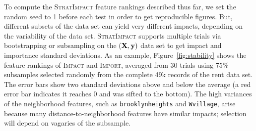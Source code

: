 \documentclass[11pt]{article}
\newcommand{\figref}[1]{Figure~\ref{#1}}
\newcommand{\Imp}{\fontfamily{cmr}\textsc{Impact}}
\newcommand{\Impo}{\fontfamily{cmr}\textsc{Import}}
\newcommand{\simp}{\fontfamily{cmr}\textsc{\small StratImpact}}
\begin{document}
To compute the \simp{} feature rankings described thus far, we set the random seed to 1 before each test in order to get reproducible figures.  But, different subsets of the data set can yield very different impacts, depending on the variability of the data set. \simp{} supports multiple trials via bootstrapping or subsampling on the $(\bf X, y)$ data set to get impact and importance standard deviations.  As an example, \figref{fig:stability} shows the  feature rankings of \Imp{} and \Impo{}, averaged from 30 trials using 75\% subsamples selected randomly from the complete 49k records of the rent data set. The error bars show two standard deviations above and below the average (a red error bar indicates it reaches 0 and was sifted to the bottom).  The high variances of the neighborhood features, such as {\tt brooklynheights} and {\tt Wvillage}, arise because many distance-to-neighborhood features have similar impacts; selection will depend on vagaries of the subsample.
 
\end{document}
